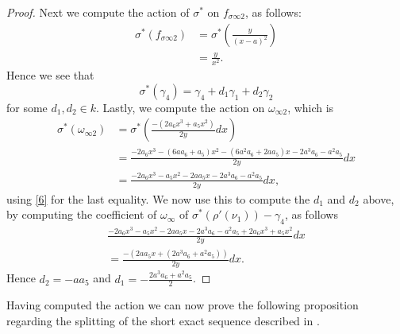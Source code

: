 \documentclass[draft, 11pt]{article} %
\theoremstyle{plain}
\theoremstyle{remark}
\begin{document}
\begin{proof}
Next we compute the action of $\sigma^*$ on $f_{\sigma \infty 2}$, as follows:
\begin{align*}
\sigma^*( f_{\sigma \infty 2}) & = \sigma^* \left( \frac{y}{(x-a)^2} \right) \\
& = \frac{y}{x^2}.
\end{align*}
Hence we see that
\[
\sigma^*( \gamma_4) = \gamma_4 + d_1\gamma_1 + d_2 \gamma_2
\]
for some $d_1, d_2 \in k$.
Lastly, we compute the action on $\omega_{\infty 2}$, which is
\begin{align*}
\sigma^* ( \omega_{\infty 2}) & = \sigma^* \left( \frac{-(2a_6x^3+a_5x^2)}{2y}dx \right) \\
& = \frac{-2a_6x^3-(6aa_6+a_5)x^2-(6a^2a_6+2aa_5)x-2a^3a_6-a^2a_5}{2y}dx \\
& = \frac{-2a_6x^3-a_5x^2 -2aa_5x -2a^3a_6 - a^2a_5}{2y}dx,
\end{align*}
using \ref{6} for the last equality.
We now use this to compute the $d_1$ and $d_2$ above, by computing the coefficient of $\omega_\infty$ of $\sigma^*(\rho'(\nu_1)) - \gamma_4$, as follows
\begin{multline*}
 \frac{-2a_6x^3-a_5x^2 -2aa_5x -2a^3a_6 - a^2a_5 + 2a_6x^3+a_5x^2}{2y}dx \\
 = \frac{-(2aa_5x +(2a^3a_6+a^2a_5))}{2y}dx.
\end{multline*}
Hence $d_2 = -aa_5$ and $d_1 = -\frac{2a^3a_6+a^2a_5}{2}$.
\end{proof}

Having computed the action we can now prove the following proposition regarding the splitting of the short exact sequence described in \cite{derhamactions}.
\end{document}

